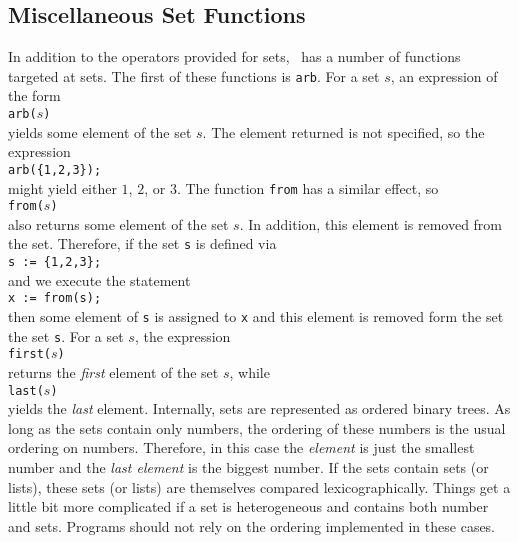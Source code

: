\subsection{Miscellaneous Set Functions}
In addition to the operators provided for sets, \setlx\ has a number of functions targeted at sets.
The first of these functions is \texttt{arb}.  For a set $s$,  an expression of the form
\\[0.2cm]
\hspace*{1.3cm}
\texttt{arb($s$)}
\\[0.2cm]
yields some element of the set $s$.  The element returned is not specified, so the expression
\\[0.2cm]
\hspace*{1.3cm}
\texttt{arb(\{1,2,3\});}
\\[0.2cm]
might yield either $1$, $2$, or $3$. 
 The function \texttt{from} has a similar effect, so
\\[0.2cm]
\hspace*{1.3cm}
\texttt{from($s$)}
\\[0.2cm]
also returns some element of the set $s$.  In addition, this element is removed from the set.
Therefore, if the set \texttt{s} is defined via
\\[0.2cm]
\hspace*{1.3cm}
\texttt{s := \{1,2,3\};}
\\[0.2cm]
and we execute the statement 
\\[0.2cm]
\hspace*{1.3cm}
\texttt{x := from(s);}
\\[0.2cm]
then some element of \texttt{s} is assigned to \texttt{x} and this element is removed form the set
the set \texttt{s}.  For a set $s$,  the expression 
\\[0.2cm]
\hspace*{1.3cm}
\texttt{first($s$)}
\\[0.2cm]
returns the \emph{first} element of the set $s$, while
\\[0.2cm]
\hspace*{1.3cm}
\texttt{last($s$)} 
\\[0.2cm]
yields the \emph{last} element.  Internally, sets are represented as ordered binary trees.  As long
as the sets contain only numbers, the ordering of these numbers is the usual ordering on
numbers. Therefore, in this case the \emph{element} is just the smallest number and the 
\emph{last element} is the biggest number.  If the sets contain sets (or lists), these sets (or
lists) are themselves compared lexicographically.  
Things get a little bit more complicated if a set is heterogeneous and contains both number and sets.
Programs should not rely on the ordering implemented in these cases.

